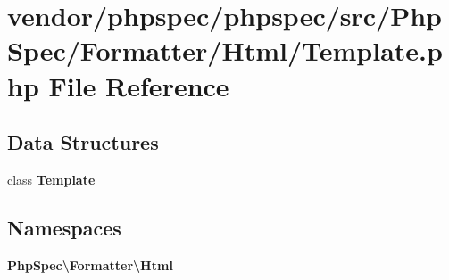 \section{vendor/phpspec/phpspec/src/\+Php\+Spec/\+Formatter/\+Html/\+Template.php File Reference}
\label{phpspec_2phpspec_2src_2_php_spec_2_formatter_2_html_2_template_8php}
\subsection*{Data Structures}
\begin{DoxyCompactItemize}
\item 
class {\bf Template}
\end{DoxyCompactItemize}
\subsection*{Namespaces}
\begin{DoxyCompactItemize}
\item 
 {\bf Php\+Spec\textbackslash{}\+Formatter\textbackslash{}\+Html}
\end{DoxyCompactItemize}
